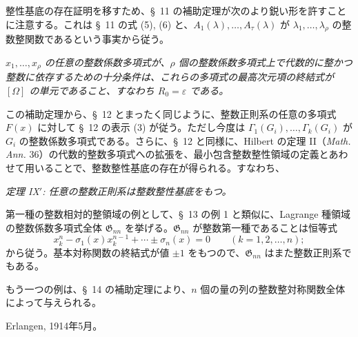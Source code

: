 \documentclass[11pt]{jlreq}
\providecommand{\Gdom}{\mathfrak{G}}
\providecommand{\eps}{\varepsilon}
\begin{document}
整性基底の存在証明を移すため、\S\ 11 の補助定理が次のより鋭い形を許すことに注意する。これは \S\ 11 の式 (5), (6) と、$A_1(\lambda),\ldots,A_\tau(\lambda)$ が $\lambda_1,\ldots,\lambda_\rho$ の整数整関数であるという事実から従う。

\emph{$x_1,\ldots,x_\rho$ の任意の整数係数多項式が、$\rho$ 個の整数係数多項式上で代数的に整かつ整数に依存するための十分条件は、これらの多項式の最高次元項の終結式が $[\Omega]$ の単元であること、すなわち $R_0=\eps$ である。}

この補助定理から、\S\ 12 とまったく同じように、整数正則系の任意の多項式 $F(x)$ に対して \S\ 12 の表示 (3) が従う。ただし今度は $\Gamma_1(G_i),\ldots,\Gamma_k(G_i)$ が $G_i$ の整数係数多項式である。さらに、\S\ 12 と同様に、Hilbert の定理 II（\emph{Math. Ann.} 36）の代数的整数多項式への拡張を、最小包含整数整性領域の定義とあわせて用いることで、整数整性基底の存在が得られる。すなわち、

\emph{定理 IX$'$: 任意の整数正則系は整数整性基底をもつ。}

第一種の整数相対的整領域の例として、\S\ 13 の例 1 と類似に、Lagrange 種領域の整数係数多項式全体 $\Gdom_{nn}$ を挙げる。$\Gdom_{nn}$ が整数第一種であることは恒等式
\[
  x_k^n-\sigma_1(x)x_k^{n-1}+\cdots\pm\sigma_n(x)=0
  \qquad(k=1,2,
\ldots,n);
\]
から従う。基本対称関数の終結式が値 $\pm1$ をもつので、$\Gdom_{nn}$ はまた整数正則系でもある。

もう一つの例は、\S\ 14 の補助定理により、$n$ 個の量の列の整数整対称関数全体によって与えられる。

Erlangen, 1914年5月。
\end{document}
